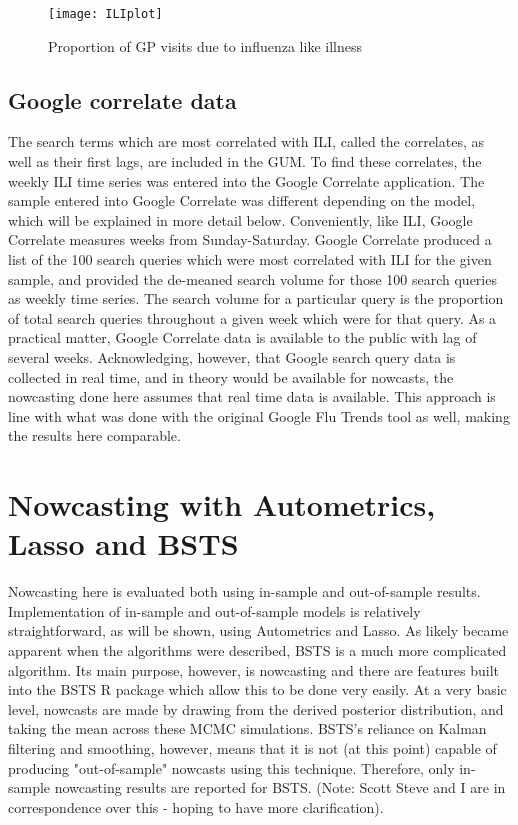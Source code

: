 \documentclass[11pt, oneside]{book}   	%
\begin{document}
\begin{figure}
\centering
\texttt{[image: ILIplot]}
\caption{Proportion of GP visits due to influenza like illness}
\label{fig:ILIplot}
\end{figure}



\subsection{Google correlate data}

The search terms which are most correlated with ILI, called the correlates, as well as their first lags, are included in the GUM. To find these correlates, the weekly ILI time series was entered into the Google Correlate application. The sample entered into Google Correlate was different depending on the model, which will be explained in more detail below. Conveniently, like ILI, Google Correlate measures weeks from Sunday-Saturday. Google Correlate produced a list of the 100 search queries which were most correlated with ILI for the given sample, and provided the de-meaned search volume for those 100 search queries as weekly time series. The search volume for a particular query is the proportion of total search queries throughout a given week which were for that query. As a practical matter, Google Correlate data is available to the public with lag of several weeks. Acknowledging, however, that Google search query data is collected in real time, and in theory would be available for nowcasts, the nowcasting done here assumes that real time data is available. This approach is line with what was done with the original Google Flu Trends tool as well, making the results here comparable. 

\section{Nowcasting with Autometrics, Lasso and BSTS}

Nowcasting here is evaluated both using in-sample and out-of-sample results. Implementation of in-sample and out-of-sample models is relatively straightforward, as will be shown, using Autometrics and Lasso. As likely became apparent when the algorithms were described, BSTS is a much more complicated algorithm. Its main purpose, however, is nowcasting and there are features built into the BSTS R package which allow this to be done very easily. At a very basic level, nowcasts are made by drawing from the derived posterior distribution, and taking the mean across these MCMC simulations.  BSTS's reliance on Kalman filtering and smoothing, however, means that it is not (at this point) capable of producing "out-of-sample" nowcasts using this technique. Therefore, only in-sample nowcasting results are reported for BSTS. (Note: Scott Steve and I are in correspondence over this - hoping to have more clarification). 
\end{document}
